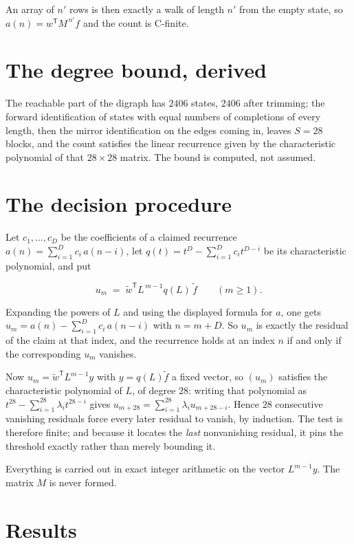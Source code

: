 \documentclass[11pt]{article}
\theoremstyle{definition}
\begin{document}
An array of $n'$ rows is then exactly a walk of length $n'$ from the empty state, so $a(n) = w^{\mathsf T}M^{\,n'}f$ and the count is C-finite.

\section{The degree bound, derived}

The reachable part of the digraph has $2406$ states, $2406$ after trimming; the forward identification of states with equal numbers of completions of every length, then the mirror identification on the edges coming in, leaves $S = 28$ blocks, and the count satisfies the linear recurrence given by the characteristic polynomial of that $28\times28$ matrix. The bound is computed, not assumed.

\section{The decision procedure}

Let $c_1,\dots,c_D$ be the coefficients of a claimed recurrence $a(n) = \sum_{i=1}^{D} c_i\,a(n-i)$, let $q(t) = t^{D} - \sum_{i=1}^{D} c_i t^{D-i}$ be its characteristic polynomial, and put

\[u_m \;=\; \tilde w^{\mathsf T} L^{\,m-1} q(L)\,\tilde f \qquad (m \ge 1).\]

Expanding the powers of $L$ and using the displayed formula for $a$, one gets $u_m = a(n) - \sum_{i=1}^{D} c_i\,a(n-i)$ with $n = m + D$. So $u_m$ is exactly the residual of the claim at that index, and the recurrence holds at an index $n$ if and only if the corresponding $u_m$ vanishes.

Now $u_m = \tilde w^{\mathsf T} L^{m-1} y$ with $y = q(L)\tilde f$ a fixed vector, so $(u_m)$ satisfies the characteristic polynomial of $L$, of degree $28$: writing that polynomial as $t^{28} - \sum_{i=1}^{28} \lambda_i t^{28-i}$ gives $u_{m+28} = \sum_{i=1}^{28} \lambda_i u_{m+28-i}$. Hence $28$ consecutive vanishing residuals force every later residual to vanish, by induction. The test is therefore finite; and because it locates the {\itshape last} nonvanishing residual, it pins the threshold exactly rather than merely bounding it.

Everything is carried out in exact integer arithmetic on the vector $L^{m-1}y$. The matrix $M$ is never formed.

\section{Results}
\end{document}
